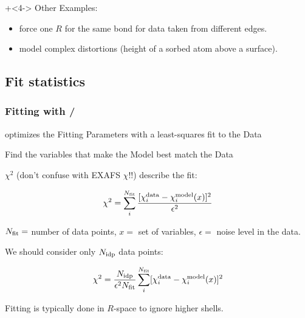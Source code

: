 \begin{frame}[fragile]
  \vmm \vmm

  \onslide+<4-> Other Examples:

\begin{itemize}
\item force one $R$ for the same bond for data taken from different  edges.
\item model complex distortions (height of a sorbed atom above a surface).
\end{itemize}

\end{frame}


\subsection{Fit statistics}
\begin{frame}\frametitle{Fitting with {\ifeffit} / {\artemis} }

  {\ifeffit} optimizes the Fitting Parameters with a least-squares fit to the
  Data

  \begin{postitbox}{90mm}
    Find the variables that make the Model best match the Data
  \end{postitbox}


  \pause \vmm


  $\chi^2$ (don't confuse with EXAFS $\chi$!!) describe the fit:

  \[
  \chi^2  =   \sum_i^{N_{\rm fit}} \frac{[\chi_i^{\rm data} - \chi_i^{\rm
      model}({x})]^2}{\epsilon^2}
  \]

  ${N_{\rm fit}} = $ number of data points, ${x} = $ set of variables,
  $\epsilon =$ noise level in the data. \pause

  We should consider only $ N_{\rm idp} $ data points:

  \begin{postitbox}{88mm}
    \[   \chi^2  =  \frac{ N_{\rm idp}}{\epsilon^2 N_{\rm fit}}
    \sum_i^{N_{\rm fit}} [\chi_i^{\rm data} - \chi_i^{\rm model}({x})]^2 \]
  \end{postitbox}

  \pause   Fitting is typically done in $R$-space to ignore higher shells.

\end{frame}

